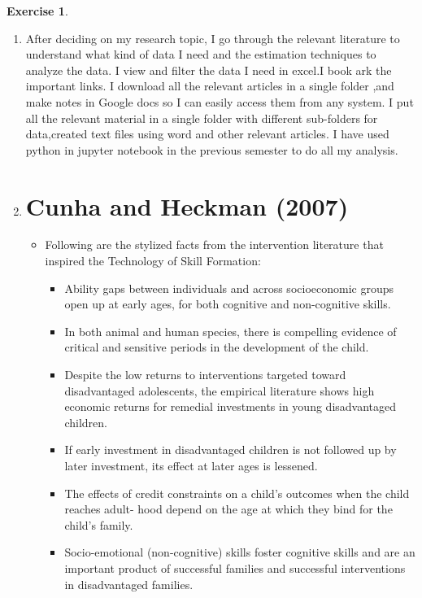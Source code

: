 \documentclass[11pt,a4paper,leqno]{article}
\theoremstyle{definition}
\newtheorem{exercise}{Exercise}
\begin{document}
\begin{exercise}
\begin{enumerate}
\begin{itemize}
     \end{itemize} 
        \item After deciding on my research topic, I go through the relevant literature to understand  what kind of data I need and the estimation techniques to analyze the data. I view and filter the data I need in excel.I book ark the important links. I download all the relevant articles in a single folder ,and make notes in Google docs so I can easily access them from any system. I put all the relevant material in a single folder with different sub-folders for data,created text files using word and other relevant articles. I have used python in jupyter notebook in the previous semester to do all my analysis. 
           
       \item \section*{Cunha and Heckman (2007)}   
        \begin{itemize}
            \item 
        Following are the stylized facts from the intervention literature that inspired the Technology of Skill Formation:
        \begin{itemize}
     \item Ability gaps between individuals and across socioeconomic groups open up at early ages, for both cognitive and non-cognitive skills. 
     \item In both animal and human species, there is compelling evidence of critical and sensitive periods in the development of the child.
     \item Despite the low returns to interventions targeted toward disadvantaged adolescents, the empirical literature shows high economic returns for remedial investments in young disadvantaged children. 
     \item If early investment in disadvantaged children is not followed up by later investment, its effect at later ages is lessened. 
     \item The effects of credit constraints on a child’s outcomes when the child reaches adult- hood depend on the age at which they bind for the child’s family.
     \item Socio-emotional (non-cognitive) skills foster cognitive skills and are an important product of successful families and successful interventions in disadvantaged families.
   \end{itemize}
 

\end{itemize}
\end{enumerate}
\end{exercise}
\end{document}
